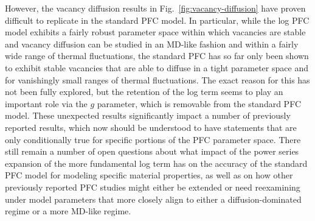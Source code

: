 However, the vacancy diffusion results in Fig.~\ref{fig:vacancy-diffusion} have proven difficult to replicate in the standard PFC model.  In particular, while the log PFC model exhibits a fairly robust parameter space within which vacancies are stable and vacancy diffusion can be studied in an MD-like fashion and within a fairly wide range of thermal fluctuations, the standard PFC has so far only been shown to exhibit stable vacancies that are able to diffuse in a tight parameter space and for vanishingly small ranges of thermal fluctuations.  The exact reason for this has not been fully explored, but the retention of the log term seems to play an important role via the $g$ parameter, which is removable from the standard PFC model.
%
%
These unexpected results significantly impact a number of previously reported results, which now should be understood to have statements that are only conditionally true for specific portions of the PFC parameter space.  There still remain a number of open questions about what impact of the power series expansion of the more fundamental log term has on the accuracy of the standard PFC model for modeling specific material properties, as well as on how other previously reported PFC studies might either be extended or need reexamining under model parameters that more closely align to either a diffusion-dominated regime or a more MD-like regime.
